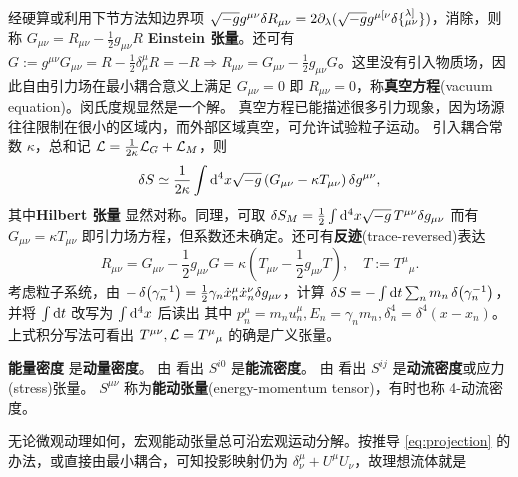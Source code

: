 经硬算或利用下节方法知边界项 $\sqrt{-g} g^{\mu\nu}\var R_{\mu\nu}=2\partial_\lambda(\sqrt{-g} g^{\mu [\nu} \delta \{_{\mu \nu}^{\lambda]}\})$，消除，则
称 $G_{\mu\nu}=R_{\mu\nu}-\frac 12 g_{\mu\nu} R$ \textbf{Einstein 张量}。还可有 $G:=g^{\mu\nu}G_{\mu\nu}=R-\frac{1}{2}\delta^\mu_\mu R=-R\Rightarrow R_{\mu\nu}=G_{\mu\nu}-\frac 12 g_{\mu\nu} G$。这里没有引入物质场，因此自由引力场在最小耦合意义上满足 $G_{\mu\nu}=0$ 即 $R_{\mu\nu}=0$，称\textbf{真空方程}(vacuum equation)。闵氏度规显然是一个解。
真空方程已能描述很多引力现象，因为场源往往限制在很小的区域内，而外部区域真空，可允许试验粒子运动。
引入耦合常数 $\kappa$，总和记 $\mathcal{L}=\frac{1}{2\kappa}\mathcal{L}_G +\mathcal{L}_M$，则
\[
\var S\simeq\frac{1}{2\kappa}\int\dd[4]x\sqrt{-g} \left(G_{\mu\nu}-\kappa T_{\mu\nu}\right)\var g^{\mu\nu},
\]
其中\textbf{Hilbert 张量}
显然对称。同理，可取 $\delta S_M =\frac{1}{2} \int\dd[4]x\sqrt{-g}\, T^{\mu \nu} \delta g_{\mu \nu}$ 而有
$G_{\mu\nu}=\kappa T_{\mu\nu}$ 即引力场方程，但系数还未确定。还可有\textbf{反迹}(trace-reversed)表达
\[ 
R_{\mu\nu}=G_{\mu\nu}-\frac 12 g_{\mu\nu} G=\kappa\left(T_{\mu\nu}-\frac12 g_{\mu\nu}T\right),\quad T:=T^\mu{}_\mu.
\]
考虑粒子系统，由 $-\var(\gamma_n^{-1})=\frac{1}{2}\gamma_n\dot x_n^\mu \dot x_n^\nu\delta g_{\mu\nu}$，计算 $\var S=-\int\dd t\sum_n m_n\var(\gamma_n^{-1})$，并将 $\int\dd t$ 改写为 $\int \dd[4]x$ 后读出
其中 $p^\mu_n=m_n u^\mu_n, E_n=\gamma_n m_n, \delta^4_n = \delta^4(x-x_n)$。
上式积分写法可看出 $T^{\mu\nu},\mathcal{L} = T^\mu{}_\mu$ 的确是广义张量。

\textbf{能量密度}
是\textbf{动量密度}。
由  看出 $S^{i0}$ 是\textbf{能流密度}。
由  看出 $S^{ij}$ 是\textbf{动流密度}或应力(stress)张量。
$S^{\mu\nu}$ 称为\textbf{能动张量}(energy-momentum tensor)，有时也称 4-动流密度。





无论微观动理如何，宏观能动张量总可沿宏观运动分解。按推导 \eqref{eq:projection} 的办法，或直接由最小耦合，可知投影映射仍为 $\delta^\mu_\nu + U^\mu U_\nu$，故理想流体就是




